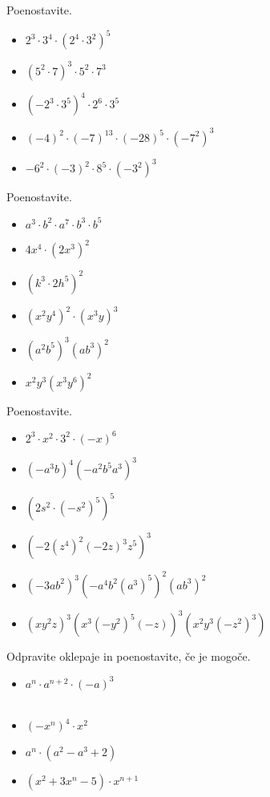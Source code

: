 \begin{multicols}{2}
        \begin{naloga}
            Poenostavite.
            \begin{itemize}
                \item $2^3\cdot 3^4\cdot(2^4\cdot 3^2)^5$ 
                \item $(5^2\cdot 7)^3\cdot 5^2\cdot 7^3$ 
                \item $(-2^3\cdot 3^5)^4\cdot 2^6\cdot 3^5$ 
                \item $(-4)^2\cdot(-7)^{13}\cdot (-28)^5\cdot (-7^2)^3$ 
                \item $-6^2\cdot(-3)^2\cdot 8^5\cdot (-3^2)^3$ 
            \end{itemize}
        \end{naloga}

        \begin{naloga}
            Poenostavite.
            \begin{itemize}
                \item $a^3\cdot b^2\cdot a^7\cdot b^3\cdot b^5$ 
                \item $4x^4\cdot(2x^3)^2$ 
                \item $(k^3\cdot 2h^5)^2$ 
                \item $(x^2y^4)^2\cdot (x^3y)^3$ 
                \item $(a^2b^5)^3(ab^3)^2$ 
                \item $x^2y^3(x^3y^6)^2$ 
            \end{itemize}
        \end{naloga}

    
        \begin{naloga}
            Poenostavite.
            \begin{itemize}
                \item $2^3\cdot x^2\cdot 3^2\cdot(-x)^6$ 
                \item $(-a^3b)^4(-a^2b^5a^3)^3$ 
                \item $(2s^2\cdot(-s^2)^5)^5$ 
                \item $(-2(z^4)^2(-2z)^3z^5)^3$ 
                \item $(-3ab^2)^3(-a^4b^2(a^3)^5)^2(ab^3)^2$ 
                \item $(xy^2z)^3(x^3(-y^2)^5(-z))^3(x^2y^3(-z^2)^3)$ 
            \end{itemize}
        \end{naloga}

        \begin{naloga}
            Odpravite oklepaje in poenostavite, če je mogoče.
            \begin{itemize}
                \item $a^n\cdot a^{n+2}\cdot(-a)^3$ \\ ~
                \item $(-x^n)^4\cdot x^2$ 
                \item $a^n\cdot(a^2-a^3+2)$ 
                \item $(x^2+3x^n-5)\cdot x^{n+1}$ 
            \end{itemize}
        \end{naloga}



\end{multicols}

